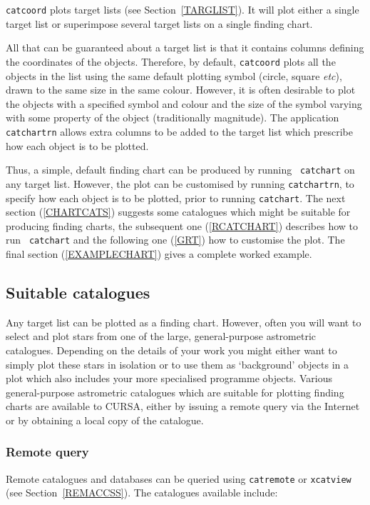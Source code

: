 \documentclass[twoside,11pt]{article}
\renewcommand{\_}{\texttt{\symbol{95}}}
\begin{document}
{\tt catcoord} plots target lists (see Section~\ref{TARGLIST}).  It will
plot either a single target list or superimpose several target lists on
a single finding chart.

All that can be guaranteed about a target list is that it contains
columns defining the coordinates of the objects.  Therefore, by default,
{\tt catcoord} plots all the objects in the list using the same default
plotting symbol (circle, square \emph{etc}\/), drawn to the same size in
the same colour.  However, it is often desirable to plot the objects with
a specified symbol and colour and the size of the symbol varying with some
property of the object (traditionally magnitude).  The application {\tt
catchartrn} allows extra columns to be added to the target list which
prescribe how each object is to be plotted.

Thus, a simple, default finding chart can be produced by running {\tt
catchart} on any target list.  However, the plot can be customised
by running {\tt catchartrn}, to specify how each object is to be plotted,
prior to running {\tt catchart}.  The next section (\ref{CHARTCATS})
suggests some catalogues which might be suitable for producing finding
charts, the subsequent one (\ref{RCATCHART}) describes how to run {\tt
catchart} and the following one (\ref{GRT}) how to customise the plot.
The final section (\ref{EXAMPLECHART}) gives a complete worked example.

\subsection{\label{CHARTCATS}Suitable catalogues}

Any target list can be plotted as a finding chart.  However, often you
will want to select and plot stars from one of the large, general-purpose
astrometric catalogues.  Depending on the details of your work you might
either want to simply plot these stars in isolation or to use them as
`background' objects in a plot which also includes your more specialised
programme objects.  Various general-purpose astrometric catalogues which
are suitable for plotting finding charts are available to CURSA, either
by issuing a remote query via the Internet or by obtaining a local
copy of the catalogue.

\subsubsection{Remote query}

Remote catalogues and databases can be queried using {\tt catremote} or
{\tt xcatview} (see Section~\ref{REMACCSS}).  The catalogues available
include:
\end{document}
